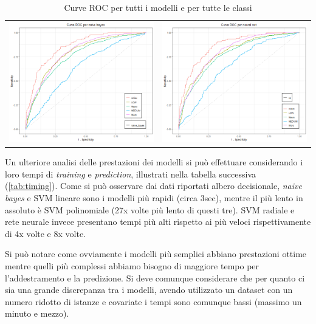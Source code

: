 \begin{table}[]
\begin{tabular}{cc}
    \includegraphics[width=.5\textwidth]{img/roc/roc_nb.png} &
    \includegraphics[width=.5\textwidth]{img/roc/roc_nn.png} \\
    \end{tabular}
    \caption{Curve ROC per tutti i modelli e per tutte le classi}
    \end{table}
    
    \restoregeometry
    \newpage
    
    Un ulteriore analisi delle prestazioni dei modelli si può effettuare considerando i loro tempi di \textit{training} e \textit{prediction}, illustrati nella tabella successiva (\ref{tab:timing}).
    Come si può osservare dai dati riportati albero decisionale, \textit{naive bayes} e SVM lineare sono i modelli più rapidi (circa 3sec), mentre il più lento in assoluto è SVM polinomiale (27x volte più lento di questi tre). SVM radiale e rete neurale invece presentano tempi più alti rispetto ai più veloci rispettivamente di 4x volte e 8x volte.
    
    Si può notare come ovviamente i modelli più semplici abbiano prestazioni ottime mentre quelli più complessi abbiamo bisogno di maggiore tempo per l'addestramento e la predizione. Si deve comunque considerare che per quanto ci sia una grande discrepanza tra i modelli, avendo utilizzato un dataset con un numero ridotto di istanze e covariate i tempi sono comunque bassi (massimo un minuto e mezzo).
    
